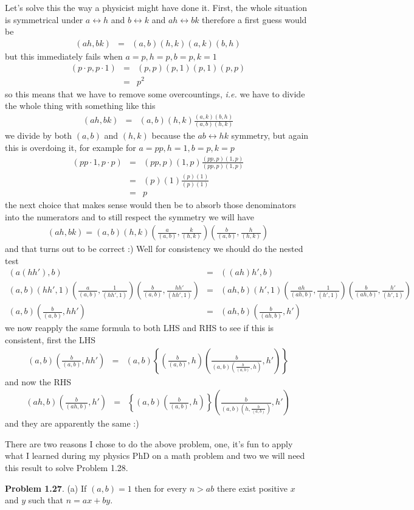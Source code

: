 \documentclass[aps,preprint,preprintnumbers,nofootinbib,showpacs,prd]{revtex4-1}
\newcommand{\ie}{{\it i.e.} }
\newcommand{\nbea}{\begin{eqnarray*}}
\newcommand{\neea}{\end{eqnarray*}}
\begin{document}
Let's solve this the way a physicist might have done it. First, the whole situation is symmetrical under $a \leftrightarrow h$ and $b \leftrightarrow k$ and $ah \leftrightarrow bk$ therefore a first guess would be
%
\nbea
(ah,bk) & = & (a,b)(h,k)(a,k)(b,h)
\neea
%
but this immediately fails when $a=p,h=p,b=p,k=1$
%
\nbea
(p\cdot p, p\cdot 1) & = & (p,p)(p,1)(p,1)(p,p) \\
& = & p^2
\neea
%
so this means that we have to remove some overcountings, \ie we have to divide the whole thing with something like this
%
\nbea
(ah,bk) & = & (a,b)(h,k)\frac{(a,k)(b,h)}{(a,b)(h,k)}
\neea
%
we divide by both $(a,b)$ and $(h,k)$ because the $ab \leftrightarrow hk$ symmetry, but again this is overdoing it, for example for $a=pp,h=1,b=p,k=p$
%
\nbea
(pp\cdot1, p\cdot p) & = & (pp,p)(1,p)\frac{(pp,p)(1,p)}{(pp,p)(1,p)} \\
& = & (p)(1)\frac{(p)(1)}{(p)(1)} \\
& = & p
\neea
%
the next choice that makes sense would then be to absorb those denominators into the numerators and to still respect the symmetry we will have
%
\nbea
(ah,bk) = (a,b)(h,k)\left ( \frac{a}{(a,b)},\frac{k}{(h,k)}\right )\left ( \frac{b}{(a,b)},\frac{h}{(h,k)}\right )
\neea
%
and that turns out to be correct :) Well for consistency we should do the nested test
%
\nbea
(a(hh'),b) & = & ((ah)h',b) \\
(a,b)(hh',1) \left ( \frac{a}{(a,b)},\frac{1}{(hh',1)}\right )\left ( \frac{b}{(a,b)},\frac{hh'}{(hh',1)}\right ) & = & (ah,b)(h',1)\left ( \frac{ah}{(ah,b)},\frac{1}{(h',1)}\right )\left ( \frac{b}{(ah,b)},\frac{h'}{(h',1)}\right ) \\
(a,b) \left ( \frac{b}{(a,b)},hh'\right ) & = & (ah,b)\left ( \frac{b}{(ah,b)},h'\right )
\neea
%
we now reapply the same formula to both LHS and RHS to see if this is consistent, first the LHS
%
\nbea
(a,b) \left ( \frac{b}{(a,b)},hh'\right ) & = & (a,b) \left\{\left ( \frac{b}{(a,b)},h\right )  \left ( \frac{b}{(a,b)\left(\frac{b}{(a,b)}, h\right)},h'\right ) \right\}
\neea
%
and now the RHS
%
\nbea
(ah,b)\left ( \frac{b}{(ah,b)},h'\right ) & = & \left \{ (a,b)\left(\frac{b}{(a,b)},h\right) \right \} \left ( \frac{b}{(a,b)\left(h,\frac{b}{(a,b)}\right)},h'\right ) 
\neea
%
and they are apparently the same :)

There are two reasons I chose to do the above problem, one, it's fun to apply what I learned during my physics PhD on a math problem and two we will need this result to solve Problem 1.28.

{\bf Problem 1.27}. (a) If $(a,b)=1$ then for every $n > ab$ there exist positive $x$ and $y$ such that $n = ax + by$.
\end{document}
